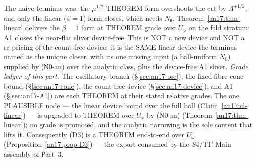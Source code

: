 \begin{remark}
\label{an17:rem-close}
The naive terminus was: the $\mu^{1/2}$ THEOREM form overshoots the cut by
$\Lambda^{+1/2}$, and only the linear ($\beta=1$) form closes, which needs $N_0$.
Theorem~\ref{an17:thm-linear} delivers the $\beta=1$ form at THEOREM grade over
$U_\omega$ on the fold stratum; A1 closes the near-flat sliver device-free. This is
NOT a new device and NOT a re-pricing of the count-free device: it is the SAME
linear device the terminus named as the unique closer, with its one missing input
(a ball-uniform $N_0$) supplied by (N0-an) over the analytic class, plus the
device-free A1 sliver. \emph{Grade ledger of this part.} The oscillatory branch
(\S\ref{sec:an17-osc}), the fixed-fibre cone bound (\S\ref{sec:an17-cone}), the
count-free device (\S\ref{sec:an17-device}), and A1 (\S\ref{sec:an17-A1}) are each
THEOREM at their stated relative grades. The one PLAUSIBLE node --- the linear
device bound over the full ball (Claim~\ref{an17:cl-linear}) --- is upgraded to
THEOREM over $U_\omega$ by (N0-an) (Theorem~\ref{an17:thm-linear}); no grade is
promoted, and the analytic narrowing is the sole content that lifts it.
Consequently (D3) is a THEOREM end-to-end over $U_\omega$
(Proposition~\ref{an17:prop-D3}) --- the export consumed by the $S4$/T1$'$-Main
assembly of Part~3.
\end{remark}


